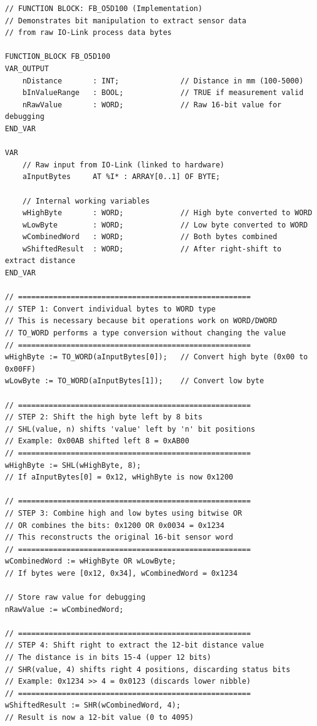\documentclass[11pt,a4paper]{article}
\begin{document}
\begin{lstlisting}
// FUNCTION BLOCK: FB_O5D100 (Implementation)
// Demonstrates bit manipulation to extract sensor data
// from raw IO-Link process data bytes

FUNCTION_BLOCK FB_O5D100
VAR_OUTPUT
    nDistance       : INT;              // Distance in mm (100-5000)
    bInValueRange   : BOOL;             // TRUE if measurement valid
    nRawValue       : WORD;             // Raw 16-bit value for debugging
END_VAR

VAR
    // Raw input from IO-Link (linked to hardware)
    aInputBytes     AT %I* : ARRAY[0..1] OF BYTE;
    
    // Internal working variables
    wHighByte       : WORD;             // High byte converted to WORD
    wLowByte        : WORD;             // Low byte converted to WORD
    wCombinedWord   : WORD;             // Both bytes combined
    wShiftedResult  : WORD;             // After right-shift to extract distance
END_VAR

// =====================================================
// STEP 1: Convert individual bytes to WORD type
// This is necessary because bit operations work on WORD/DWORD
// TO_WORD performs a type conversion without changing the value
// =====================================================
wHighByte := TO_WORD(aInputBytes[0]);   // Convert high byte (0x00 to 0x00FF)
wLowByte := TO_WORD(aInputBytes[1]);    // Convert low byte

// =====================================================
// STEP 2: Shift the high byte left by 8 bits
// SHL(value, n) shifts 'value' left by 'n' bit positions
// Example: 0x00AB shifted left 8 = 0xAB00
// =====================================================
wHighByte := SHL(wHighByte, 8);
// If aInputBytes[0] = 0x12, wHighByte is now 0x1200

// =====================================================
// STEP 3: Combine high and low bytes using bitwise OR
// OR combines the bits: 0x1200 OR 0x0034 = 0x1234
// This reconstructs the original 16-bit sensor word
// =====================================================
wCombinedWord := wHighByte OR wLowByte;
// If bytes were [0x12, 0x34], wCombinedWord = 0x1234

// Store raw value for debugging
nRawValue := wCombinedWord;

// =====================================================
// STEP 4: Shift right to extract the 12-bit distance value
// The distance is in bits 15-4 (upper 12 bits)
// SHR(value, 4) shifts right 4 positions, discarding status bits
// Example: 0x1234 >> 4 = 0x0123 (discards lower nibble)
// =====================================================
wShiftedResult := SHR(wCombinedWord, 4);
// Result is now a 12-bit value (0 to 4095)


\end{lstlisting}
\end{document}
